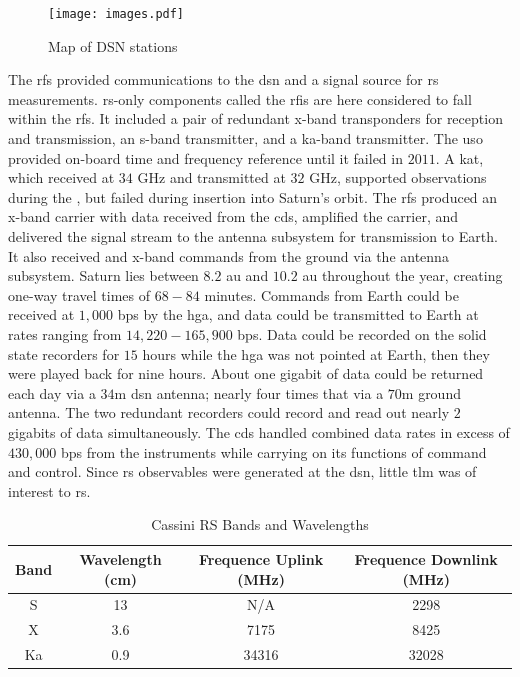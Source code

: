 \documentclass[oneside]{book}
\theoremstyle{mystyle}
\begin{document}
\begin{figure}
	\centering
	\vspace{-5ex}
	\texttt{[image: images.pdf]}
	\caption{Map of DSN stations}
	\label{fig:usr_dsn_map_1}
\end{figure}

The \gls{rfs} provided communications to the \gls{dsn} and a signal source for \gls{rs} measurements. \gls{rs}-only components called the \gls{rfis} are here considered to fall within the \gls{rfs}. It included a pair of redundant \gls{x-band} \glspl{transponder} for reception and transmission, an \gls{s-band} \gls{transmitter}, and a \gls{ka-band}
\gls{transmitter}. The \gls{uso} provided on-board time and \gls{frequency} reference until it failed in $2011$. A \gls{kat}, which received at $34$ GHz and transmitted  at $32$ GHz, supported  observations during the , but failed during insertion into Saturn's orbit. The \gls{rfs} produced an \gls{x-band} \gls{carrier}  with data received from the \gls{cds}, amplified the  carrier, and delivered the signal stream to the antenna subsystem for transmission to Earth. It also received and  \gls{x-band} commands from the ground via the antenna subsystem. Saturn lies between $8.2$ \gls{au} and $10.2$ \gls{au} throughout the year, creating one-way travel times of $68-84$ minutes. Commands from Earth could be received at $1,000$ \gls{bps} by the \gls{hga}, and data could be transmitted to Earth at rates ranging from $14,220-165,900$ \gls{bps}. Data could be recorded on the solid state recorders for $15$ hours while the \gls{hga} was not pointed at Earth, then they were played back for nine hours. About one gigabit of data could be returned each day via a $34$m \gls{dsn} antenna; nearly four times that via a $70$m ground antenna. The two redundant recorders could record and read out nearly $2$ gigabits of data simultaneously. The \gls{cds} handled combined data rates in excess of $430,000$ \gls{bps} from the instruments while carrying on its functions of command and control. Since \gls{rs} observables were generated at the \gls{dsn}, little \gls{tlm} was of interest to \gls{rs}.

\begin{table}[H]
    \centering
    \caption{Cassini RS Bands and Wavelengths}
    \label{tab:usr_band_wav}
    \footnotesize
    \begin{tabular}{|c|c|c|c|}
        \hline
        Band & Wavelength (cm) & Frequence Uplink (MHz)
        & Frequence Downlink (MHz) \\
        \hline
        S  & 13  & N/A   & 2298 \\
        X  & 3.6 & 7175  & 8425 \\
        Ka & 0.9 & 34316 & 32028 \\
        \hline
    \end{tabular}
\end{table}
\end{document}
